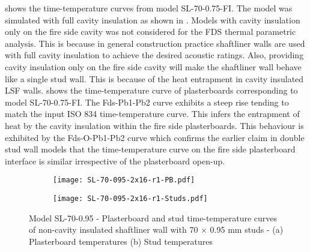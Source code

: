  shows the time-temperature curves from model SL-70-0.75-FI. The model was simulated with full cavity insulation as shown in . Models with cavity insulation only on the fire side cavity was not considered for the FDS thermal parametric analysis. This is because in general construction practice shaftliner walls are used with full cavity insulation to achieve the desired acoustic ratings. Also, providing cavity insulation only on the fire side cavity will make the shaftliner wall behave like a single stud wall. This is because of the heat entrapment in cavity insulated LSF walls.  shows the time-temperature curve of plasterboards corresponding to model SL-70-0.75-FI. The Fds-Pb1-Pb2 curve exhibits a steep rise tending to match the input ISO 834 time-temperature curve. This infers the entrapment of heat by the cavity insulation within the fire side plasterboards. This behaviour is exhibited by the Fds-O-Pb1-Pb2 curve which confirms the earlier claim in double stud wall models that the time-temperature curve on the fire side plasterboard interface is similar irrespective of the plasterboard open-up. 
\begin{figure}[!htbp]
	\centering
	\begin{subfigure}[b]{0.6\textwidth}
		\centering
		\texttt{[image: SL-70-095-2x16-r1-PB.pdf]}
		\caption{}
		\label{subfig:SL-70-095-2x16-r1-PB}
	\end{subfigure}
	\begin{subfigure}[b]{0.6\textwidth}
		\centering
		\texttt{[image: SL-70-095-2x16-r1-Studs.pdf]}
		\caption{}
		\label{subfig:SL-70-095-2x16-r1-Studs}
	\end{subfigure}
	   \caption{Model SL-70-0.95 - Plasterboard and stud time-temperature curves of non-cavity insulated shaftliner wall with 70 $\times$ 0.95 mm studs - (a) Plasterboard temperatures (b) Stud temperatures}
	   \label{fig:SL-70-095-2x16-r1}
\end{figure}

